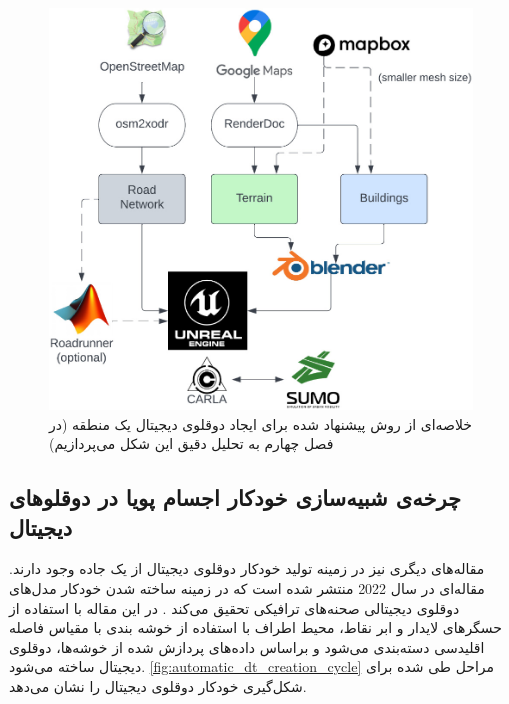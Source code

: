 \begin{figure}[h]
	\centering
	\includegraphics[scale=0.24]{figures/Digital_Twin_Procedure.png}
	\caption{  خلاصه‌ای از روش پیشنهاد شده برای ایجاد دوقلوی دیجیتال یک منطقه (در فصل چهارم به تحلیل دقیق این شکل می‌پردازیم) \cite{azfar2022efficient}}
	\label{fig:dt_procedure}
\end{figure}

\subsection{چرخه‌ی شبیه‌سازی خودکار اجسام پویا در دوقلوهای دیجیتال}

مقاله‌‌‌های دیگری نیز در زمینه تولید خودکار دوقلوی دیجیتال از یک جاده وجود دارند. مقاله‌‌ای در سال 2022 منتشر شده است که در زمینه ساخته شدن خودکار مدل‌های دوقلوی دیجیتالی صحنه‌های ترافیکی تحقیق می‌کند \cite{wang2022automatic}. در این مقاله با استفاده از حسگرهای لایدار و ابر نقاط، محیط اطراف با استفاده از خوشه بندی با مقیاس فاصله اقلیدسی دسته‌بندی می‌شود و براساس داده‌های پردازش شده از خوشه‌‌ها، دوقلوی دیجیتال ساخته می‌شود. \cref{fig:automatic_dt_creation_cycle} مراحل طی شده برای شکل‌گیری خودکار دوقلوی دیجیتال را نشان می‌دهد.

